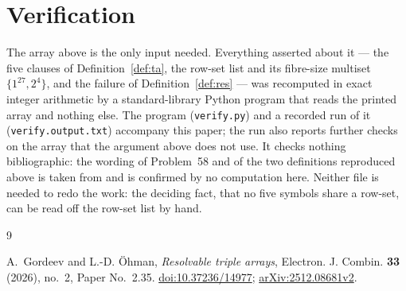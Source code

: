 \documentclass[11pt]{amsart}
\theoremstyle{definition}
\begin{document}
\section{Verification}

The array above is the only input needed. Everything asserted about it --- the five clauses
of Definition~\ref{def:ta}, the row-set list and its fibre-size multiset $\{1^{27},2^4\}$,
and the failure of Definition~\ref{def:res} --- was recomputed in exact integer arithmetic
by a standard-library Python program that reads the printed array and nothing else. The
program (\texttt{verify.py}) and a recorded run of it (\texttt{verify.output.txt}) accompany
this paper; the run also reports further checks on the array that the argument above does
not use. It checks nothing bibliographic: the wording of Problem~58 and of the two
definitions reproduced above is taken from \cite{GO} and is confirmed by no computation
here. Neither file is needed to redo the work: the deciding fact, that no five symbols
share a row-set, can be read off the row-set list by hand.

\begin{thebibliography}{9}

A.~Gordeev and L.-D. \"Ohman,
\emph{Resolvable triple arrays},
Electron. J. Combin. \textbf{33} (2026), no.~2, Paper No.~2.35.
\href{https://doi.org/10.37236/14977}{doi:10.37236/14977};
\href{https://arxiv.org/abs/2512.08681}{arXiv:2512.08681v2}.

\end{thebibliography}
\end{document}
